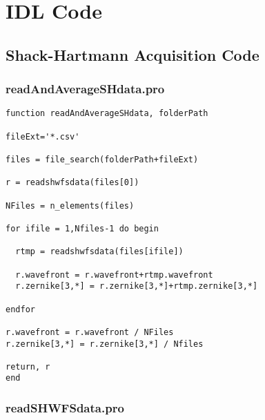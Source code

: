 \chapter{IDL Code}
\label{AppIDLCode}

\section{Shack-Hartmann Acquisition Code}
\label{app:SHacquisCode}

\subsection{readAndAverageSHdata.pro}
\label{subapp:readAndAverageSHdata}

\begin{lstlisting}
function readAndAverageSHdata, folderPath

fileExt='*.csv'

files = file_search(folderPath+fileExt)

r = readshwfsdata(files[0])

NFiles = n_elements(files)

for ifile = 1,Nfiles-1 do begin
  
  rtmp = readshwfsdata(files[ifile])
  
  r.wavefront = r.wavefront+rtmp.wavefront
  r.zernike[3,*] = r.zernike[3,*]+rtmp.zernike[3,*]
  
endfor

r.wavefront = r.wavefront / NFiles
r.zernike[3,*] = r.zernike[3,*] / Nfiles

return, r
end
\end{lstlisting}

\subsection{readSHWFSdata.pro}
\label{subapp:readSHWFSdata}

